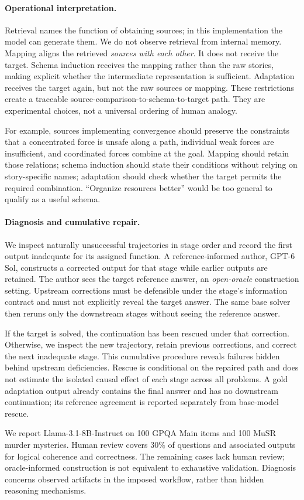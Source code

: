 \paragraph{Operational interpretation.}
Retrieval names the function of obtaining sources; in this implementation the model can generate them. We do not observe retrieval from internal memory. Mapping aligns the retrieved \emph{sources with each other}. It does not receive the target. Schema induction receives the mapping rather than the raw stories, making explicit whether the intermediate representation is sufficient. Adaptation receives the target again, but not the raw sources or mapping. These restrictions create a traceable source-comparison-to-schema-to-target path. They are experimental choices, not a universal ordering of human analogy.

For example, sources implementing convergence should preserve the constraints that a concentrated force is unsafe along a path, individual weak forces are insufficient, and coordinated forces combine at the goal. Mapping should retain those relations; schema induction should state their conditions without relying on story-specific names; adaptation should check whether the target permits the required combination. ``Organize resources better'' would be too general to qualify as a useful schema.

\paragraph{Diagnosis and cumulative repair.}
We inspect naturally unsuccessful trajectories in stage order and record the first output inadequate for its assigned function. A reference-informed author, GPT-6 Sol, constructs a corrected output for that stage while earlier outputs are retained. The author sees the target reference answer, an \emph{open-oracle} construction setting. Upstream corrections must be defensible under the stage's information contract and must not explicitly reveal the target answer. The same base solver then reruns only the downstream stages without seeing the reference answer.

If the target is solved, the continuation has been rescued under that correction. Otherwise, we inspect the new trajectory, retain previous corrections, and correct the next inadequate stage. This cumulative procedure reveals failures hidden behind upstream deficiencies. Rescue is conditional on the repaired path and does not estimate the isolated causal effect of each stage across all problems. A gold adaptation output already contains the final answer and has no downstream continuation; its reference agreement is reported separately from base-model rescue.

We report Llama-3.1-8B-Instruct on 100 GPQA Main items and 100 MuSR murder mysteries. Human review covers 30\% of questions and associated outputs for logical coherence and correctness. The remaining cases lack human review; oracle-informed construction is not equivalent to exhaustive validation. Diagnosis concerns observed artifacts in the imposed workflow, rather than hidden reasoning mechanisms.
